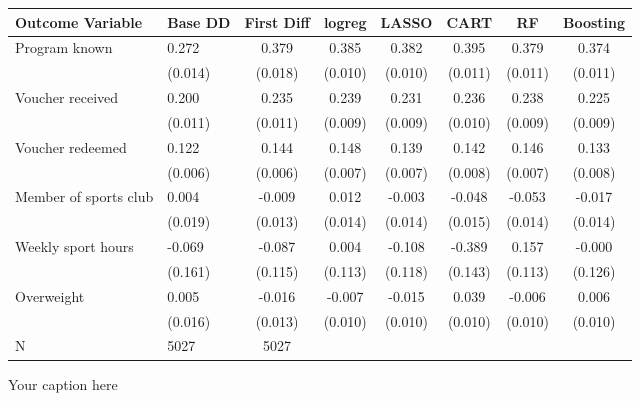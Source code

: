 \begin{adjustbox}{angle=90}
\begin{tabular}{llcccccc}
\hline
Outcome Variable & Base DD & First Diff & logreg & LASSO & CART & RF & Boosting \\
\hline
Program known & 0.272 & 0.379 & 0.385 & 0.382 & 0.395 & 0.379 & 0.374 \\
  & (0.014) & (0.018) & (0.010) & (0.010) & (0.011) & (0.011) & (0.011) \\
Voucher received & 0.200 & 0.235 & 0.239 & 0.231 & 0.236 & 0.238 & 0.225 \\
  & (0.011) & (0.011) & (0.009) & (0.009) & (0.010) & (0.009) & (0.009) \\
Voucher redeemed & 0.122 & 0.144 & 0.148 & 0.139 & 0.142 & 0.146 & 0.133 \\
  & (0.006) & (0.006) & (0.007) & (0.007) & (0.008) & (0.007) & (0.008) \\
Member of sports club & 0.004 & -0.009 & 0.012 & -0.003 & -0.048 & -0.053 & -0.017 \\
  & (0.019) & (0.013) & (0.014) & (0.014) & (0.015) & (0.014) & (0.014) \\
Weekly sport hours & -0.069 & -0.087 & 0.004 & -0.108 & -0.389 & 0.157 & -0.000 \\
  & (0.161) & (0.115) & (0.113) & (0.118) & (0.143) & (0.113) & (0.126) \\
Overweight & 0.005 & -0.016 & -0.007 & -0.015 & 0.039 & -0.006 & 0.006 \\
  & (0.016) & (0.013) & (0.010) & (0.010) & (0.010) & (0.010) & (0.010) \\
\hline
N & 5027 & 5027  &  &  &  &  \\
\hline
\end{tabular}
\caption{Your caption here}
\label{tab:your_label}
\end{adjustbox}